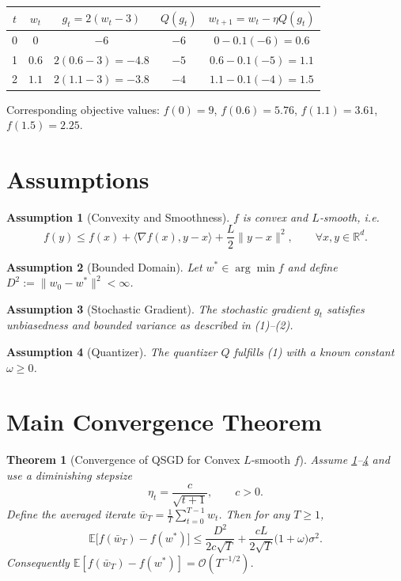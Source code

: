 \documentclass{article}
\newtheorem{theorem}{Theorem}
\newtheorem{assumption}{Assumption}
\newcommand{\E}{\mathbb{E}}
\newcommand{\R}{\mathbb{R}}
\begin{document}
\begin{center}
\begin{tabular}{c|c|c|c|c}
$t$ & $w_{t}$ & $g_{t}=2(w_{t}-3)$ & $Q(g_{t})$ & $w_{t+1}=w_{t}-\eta Q(g_{t})$ \\ \hline
0 & $0$ & $-6$ & $-6$ & $0-0.1(-6)=0.6$ \\
1 & $0.6$ & $2(0.6-3)=-4.8$ & $-5$ & $0.6-0.1(-5)=1.1$ \\
2 & $1.1$ & $2(1.1-3)=-3.8$ & $-4$ & $1.1-0.1(-4)=1.5$ \\
\end{tabular}
\end{center}
Corresponding objective values: $f(0)=9$, $f(0.6)=5.76$, $f(1.1)=3.61$, $f(1.5)=2.25$.

\newpage

\section*{Assumptions}
\begin{assumption}[Convexity and Smoothness]\label{ass:convex}
$f$ is convex and $L$‑smooth, i.e.
\[
f(y)\le f(x)+\langle\nabla f(x),y-x\rangle+\frac{L}{2}\|y-x\|^{2},\qquad \forall x,y\in\R^{d}.
\]
\end{assumption}

\begin{assumption}[Bounded Domain]\label{ass:bounded}
Let $w^{*}\in\arg\min f$ and define $D^{2}:=\|w_{0}-w^{*}\|^{2}<\infty$.
\end{assumption}

\begin{assumption}[Stochastic Gradient]\label{ass:stoch}
The stochastic gradient $g_{t}$ satisfies unbiasedness and bounded variance as described in (1)–(2).
\end{assumption}

\begin{assumption}[Quantizer]\label{ass:quant}
The quantizer $Q$ fulfills (1) with a known constant $\omega\ge0$.
\end{assumption}

\section*{Main Convergence Theorem}
\begin{theorem}[Convergence of QSGD for Convex $L$‑smooth $f$]\label{thm:convex}
Assume \ref{ass:convex}–\ref{ass:quant} and use a diminishing stepsize
\[
\eta_{t}= \frac{c}{\sqrt{t+1}},\qquad c>0.
\]
Define the averaged iterate $\bar w_{T}= \frac{1}{T}\sum_{t=0}^{T-1}w_{t}$.  
Then for any $T\ge1$,
\[
\E\!\bigl[f(\bar w_{T})-f(w^{*})\bigr]\le
\frac{D^{2}}{2c\sqrt{T}}+
\frac{cL}{2\sqrt{T}}\bigl(1+\omega\bigr)\sigma^{2}.
\tag{3}
\]
Consequently $\E[f(\bar w_{T})-f(w^{*})]=\mathcal O(T^{-1/2})$.
\end{theorem}
\end{document}
